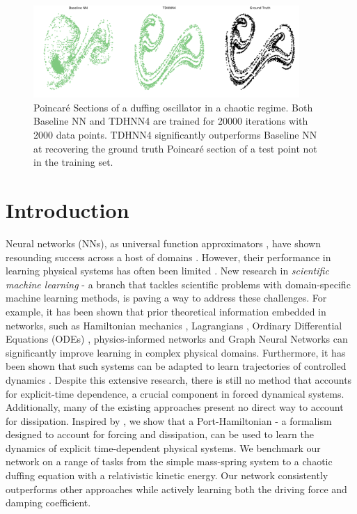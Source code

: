 \documentclass[twoside]{article}
\begin{document}
\begin{figure}[ht!]
\centering
\includegraphics[width=0.9\textwidth]{figures/main_fig.pdf}
\caption{Poincar\'e Sections of a duffing oscillator in a chaotic regime. Both Baseline NN and TDHNN4 are trained for 20000 iterations with 2000 data points. TDHNN4 significantly outperforms Baseline NN at recovering the ground truth Poincar\'e section of a test point not in the training set.}
\label{fig.chaos1}
\end{figure}

\section{Introduction}

Neural networks (NNs), as universal function approximators \cite{hornik_multilayer_1989}, have shown resounding success across a host of domains \cite{he_mask_2018,devlin_bert_2019,toussaint_differentiable_2018,yao_tensormol-01_2018}. However, their performance in learning physical systems has often been limited \cite{greydanus_hamiltonian_2019,pukrittayakamee_simultaneous_2009}. New research in \textit{scientific machine learning} - a branch that tackles scientific problems with domain-specific machine learning methods, is paving a way to address these challenges. For example, it has been shown that prior theoretical information embedded in networks, such as Hamiltonian mechanics \cite{greydanus_hamiltonian_2019}, Lagrangians \cite{cranmer_lagrangian_2020, lutter_deep_2019}, Ordinary Differential Equations (ODEs) \cite{chen_neural_2018}, physics-informed networks \cite{raissi_physics_2017} and Graph Neural Networks \cite{battaglia_interaction_2016,sanchez-gonzalez_hamiltonian_2019} can significantly improve learning in complex physical domains. Furthermore, it has been shown that such systems can be adapted to learn trajectories of controlled dynamics \cite{lutter_deep_2019,zhong_dissipative_2020}. Despite this extensive research, there is still no method that accounts for explicit-time dependence, a crucial component in forced dynamical systems. Additionally, many of the existing approaches present no direct way to account for dissipation. Inspired by \cite{zhong_dissipative_2020}, we show that a Port-Hamiltonian - a formalism designed to account for forcing and dissipation, can be used to learn the dynamics of explicit time-dependent physical systems. We benchmark our network on a range of tasks from the simple mass-spring system to a chaotic duffing equation with a relativistic kinetic energy. Our network consistently outperforms other approaches while actively learning both the driving force and damping coefficient. 
\end{document}
